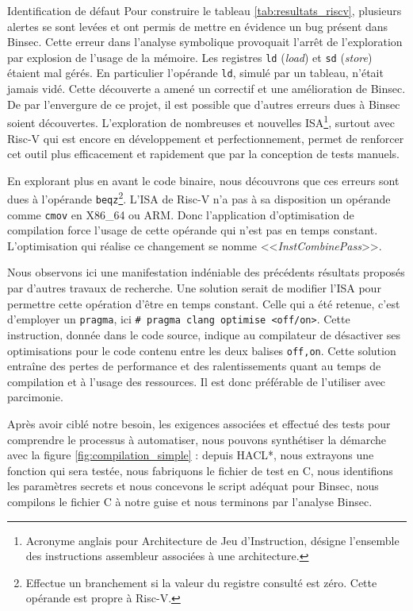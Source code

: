 \begin{CitationBox}{Identification de défaut}
    Pour construire le tableau \ref{tab:resultats_riscv}, plusieurs alertes se sont levées et ont permis de mettre en évidence un bug présent dans Binsec. Cette erreur dans l'analyse symbolique provoquait l'arrêt de l'exploration par explosion de l'usage de la mémoire. Les registres \texttt{ld} (\textit{load}) et \texttt{sd} (\textit{store}) étaient mal gérés. En particulier l'opérande \texttt{ld}, simulé par un tableau, n'était jamais vidé. Cette découverte a amené un correctif et une amélioration de Binsec. De par l'envergure de ce projet, il est possible que d'autres erreurs dues à Binsec soient découvertes. L'exploration de nombreuses et nouvelles ISA\footnote{Acronyme anglais pour Architecture de Jeu d'Instruction, désigne l'ensemble des instructions assembleur associées à une architecture.}, surtout avec Risc-V qui est encore en développement et perfectionnement, permet de renforcer cet outil plus efficacement et rapidement que par la conception de tests manuels.\medbreak
\end{CitationBox}
    
    


En explorant plus en avant le code binaire, nous découvrons que ces erreurs sont dues à l'opérande \texttt{beqz}\footnote{Effectue un branchement si la valeur du registre consulté est zéro. Cette opérande est propre à Risc-V.}. L'ISA de Risc-V n'a pas à sa disposition un opérande comme \texttt{cmov} en X86\_64 ou ARM. Donc l'application d'optimisation de compilation force l'usage de cette opérande qui n'est pas en temps constant. L'optimisation qui réalise ce changement se nomme <<\textit{InstCombinePass}>>.\medbreak

Nous observons ici une manifestation indéniable des précédents résultats proposés par d'autres travaux de recherche. Une solution serait de modifier l'ISA pour permettre cette opération d'être en temps constant. Celle qui a été retenue, c'est d'employer un \texttt{pragma}, ici \texttt{\# pragma clang optimise <off/on>}. Cette instruction, donnée dans le code source, indique au compilateur de désactiver ses optimisations pour le code contenu entre les deux balises \texttt{off,on}. Cette solution entraîne des pertes de performance et des ralentissements quant au temps de compilation et à l'usage des ressources. Il est donc préférable de l'utiliser avec parcimonie.\medbreak

Après avoir ciblé notre besoin, les exigences associées et effectué des tests pour comprendre le processus à automatiser, nous pouvons synthétiser la démarche avec la figure \ref{fig:compilation_simple} : depuis HACL*, nous extrayons une fonction qui sera testée, nous fabriquons le fichier de test en C, nous identifions les paramètres secrets et nous concevons le script adéquat pour Binsec, nous compilons le fichier C à notre guise et nous terminons par l'analyse Binsec.

